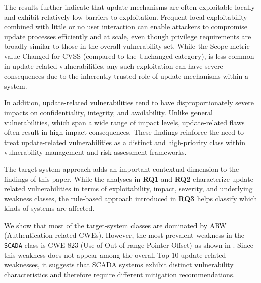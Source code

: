 \documentclass[fleqn,s1,names,tex]{neptune}
\begin{document}
The results further indicate that update mechanisms are often exploitable locally and exhibit relatively low barriers to exploitation. 
Frequent local exploitability combined with little or no user interaction can enable attackers to compromise update processes efficiently and at scale, even though privilege requirements are broadly similar to those in the overall vulnerability set. 
While the Scope metric value  Changed for CVSS  (compared to the Unchanged category), is less common in update-related vulnerabilities, any such exploitation can have severe consequences due to the inherently trusted role of update mechanisms within a system.







In addition, update-related vulnerabilities tend to have disproportionately severe impacts on confidentiality, integrity, and availability.
Unlike general vulnerabilities, which span a wide range of impact levels, update-related flaws often result in high-impact consequences. 
These findings reinforce the need to treat update-related vulnerabilities as a distinct and high-priority class within vulnerability management and risk assessment frameworks.





The target-system approach adds an important contextual dimension to the findings of this paper. 
While the analyses in \textbf{RQ1} and \textbf{RQ2} characterize update-related vulnerabilities in terms of exploitability, impact, severity, and underlying weakness classes, the rule-based approach introduced in \textbf{RQ3} helps classify which kinds of systems are affected.



We show that most of the target-system classes are dominated by  ARW (Authentication-related CWEs).
However, the most prevalent weakness in the \texttt{SCADA} class is CWE-823 (Use of Out-of-range Pointer Offset) as shown in  .
Since this weakness does not appear among the overall Top 10 update-related weaknesses, it suggests that SCADA systems exhibit distinct vulnerability characteristics and therefore require different mitigation recommendations.
\end{document}

